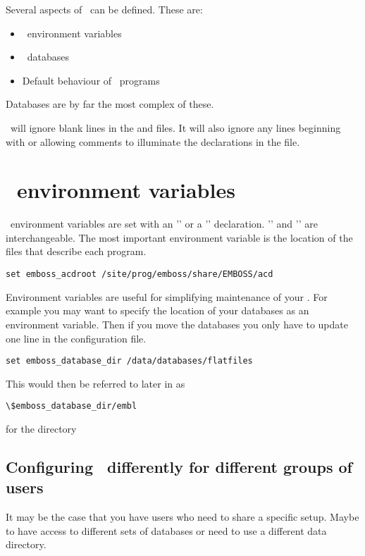 \documentclass{report}
\begin{document}
Several aspects of \EMBOSS\ can be defined. These are:
\begin{itemize}
\item\EMBOSS\ environment variables
\item\EMBOSS\ databases
\item Default behaviour of \EMBOSS\ programs
\end{itemize}
Databases are by far the most complex of these. 

\EMBOSS\ will ignore blank lines in the  and
 files. It will also ignore any lines beginning
with \ilcomm{\#} or \ilcomm{!} allowing comments to illuminate the
declarations in the file.


\section{\EMBOSS\ environment variables}

\EMBOSS\ environment variables are set with an '' or a
'' declaration. '' and '' are
interchangeable.  The most important environment variable is the
location of the  files that describe each program.

\begin{verbatim}
set emboss_acdroot /site/prog/emboss/share/EMBOSS/acd
\end{verbatim}

Environment variables are useful for simplifying maintenance of your
. For example you may want to specify the location
of your databases as an environment variable. Then if you move the
databases you only have to update one line in the configuration file.

\begin{verbatim}
set emboss_database_dir /data/databases/flatfiles
\end{verbatim}

This would then be referred to later in  as

\begin{verbatim}
\$emboss_database_dir/embl 
\end{verbatim}

for the directory  

\subsection{Configuring \EMBOSS\ differently for different groups of users}
It may be the case that you have users who need to share a specific
setup. Maybe to have access to different sets of databases or need to
use a different data directory.
\end{document}
